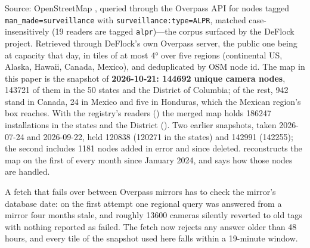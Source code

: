 \documentclass[11pt,twoside]{article}
\begin{document}
Source: OpenStreetMap \citep{osm}, queried through the Overpass API \citep{olbricht2015} for nodes tagged
\texttt{man\_made=\allowbreak surveillance} with \texttt{surveillance:\allowbreak type=ALPR},
matched case-insensitively (19 readers are tagged \texttt{alpr})---the corpus surfaced by the
DeFlock project. Retrieved through DeFlock's own Overpass server, the public one being at
capacity that day, in tiles of at most \ang{4} over five regions (continental US, Alaska,
Hawaii, Canada, Mexico), and deduplicated by OSM node id.
The map in this paper is the snapshot of \textbf{2026-10-21: \num{144692} unique camera
nodes}, \num{143721} of them in the 50 states and the District of Columbia; of the rest, 942
stand in Canada, 24 in Mexico and five in Honduras, which the Mexican region's box reaches. With
the registry's readers () the merged map holds \num{186247}
installations in the states and the District (). Two earlier snapshots, taken
2026-07-24 and 2026-09-22, held \num{120838} (\num{120271} in the states) and \num{142991}
(\num{142255}); the second includes
\num{1181} nodes added in error and since deleted.  reconstructs the map
on the first of every month since January 2024, and says how those nodes are handled.

A fetch that fails over between Overpass mirrors has to check the mirror's database date: on
the first attempt one regional query was answered from a mirror four months stale, and roughly
\num{13600} cameras silently reverted to old tags with nothing reported as failed. The fetch
now rejects any answer older than 48 hours, and every tile of the snapshot used here falls
within a 19-minute window.
\end{document}
